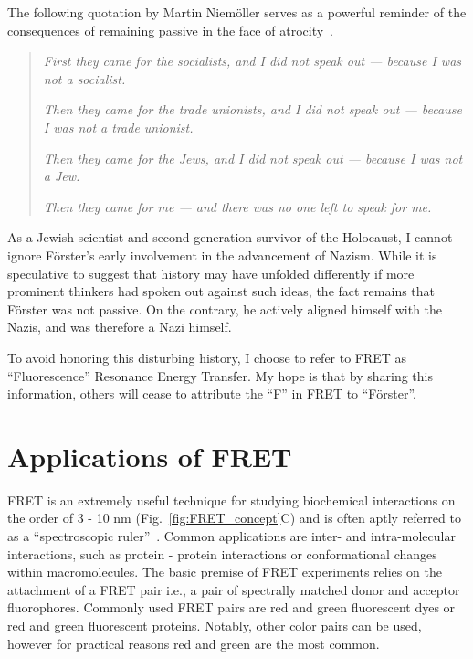 The following quotation by Martin Niem{\"o}ller serves as a powerful reminder of the consequences of remaining passive in the face of atrocity~\cite{martin_niemoller}. 

\begin{quote}
\centering 
\textit{First they came for the socialists, and I did not speak out — because I was not a socialist.}

\textit{Then they came for the trade unionists, and I did not speak out — because I was not a trade unionist.}

\textit{Then they came for the Jews, and I did not speak out — because I was not a Jew.}

\textit{Then they came for me — and there was no one left to speak for me.}
\end{quote}

As a Jewish scientist and second-generation survivor of the Holocaust, I cannot ignore F{\"o}rster's early involvement in the advancement of Nazism.
While it is speculative to suggest that history may have unfolded differently if more prominent thinkers had spoken out against such ideas, the fact remains that F{\"o}rster was not passive. 
On the contrary, he actively aligned himself with the Nazis, and was therefore a Nazi himself. 

To avoid honoring this disturbing history, I choose to refer to FRET as \enquote{Fluorescence} Resonance Energy Transfer. 
My hope is that by sharing this information, others will cease to attribute the \enquote{F} in FRET to \enquote{F{\"o}rster}.
 
\section{Applications of FRET
\label{sec:FRET_applications}}

FRET is an extremely useful technique for studying biochemical interactions on the order of 3 - 10 nm (Fig.~\ref{fig:FRET_concept}C) and is often aptly referred to as a \enquote{spectroscopic ruler}~\cite{stryer_PNAS_1967}. 
Common applications are inter- and intra-molecular interactions, such as protein - protein interactions or conformational changes within macromolecules. 
The basic premise of FRET experiments relies on the attachment of a FRET pair i.e., a pair of spectrally matched donor and acceptor fluorophores.
Commonly used FRET pairs are red and green fluorescent dyes or red and green fluorescent proteins. 
Notably, other color pairs can be used, however for practical reasons red and green are the most common.

